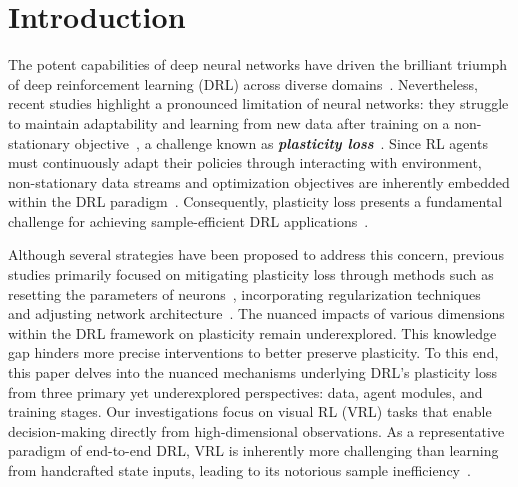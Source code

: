 \section{\textbf{Introduction}}
\vspace{-0.5\baselineskip}
The potent capabilities of deep neural networks have driven the brilliant triumph of deep reinforcement learning (DRL) across diverse domains~\citep{AlphaGo_Zero, AlphaFold, GPT4TR}.
Nevertheless, recent studies highlight a pronounced limitation of neural networks: they struggle to maintain adaptability and learning from new data after training on a non-stationary objective~\citep{capacity_loss, dormant_neuron}, a challenge known as \textbf{\textit{plasticity loss}}~\citep{understanding_plasticity, plasticity_loss_CRL}.
Since RL agents must continuously adapt their policies through interacting with environment, non-stationary data streams and optimization objectives are inherently embedded within the DRL paradigm~\citep{Regenerative_Regularization}.
Consequently, plasticity loss presents a fundamental challenge for achieving sample-efficient DRL applications~\citep{primacy_bias, breaking_RR_barrier}.

Although several strategies have been proposed to address this concern, previous studies primarily focused on mitigating plasticity loss through methods such as resetting the parameters of neurons~\citep{primacy_bias, breaking_RR_barrier, dormant_neuron}, incorporating regularization techniques~\citep{Regenerative_Regularization, understanding_plasticity, capacity_loss} and adjusting network architecture~\citep{BBF, continual_backprop, plasticity_loss_CRL}.
The nuanced impacts of various dimensions within the DRL framework on plasticity remain underexplored.
This knowledge gap hinders more precise interventions to better preserve plasticity.
To this end, this paper delves into the nuanced mechanisms underlying DRL's plasticity loss from three primary yet underexplored perspectives: data, agent modules, and training stages.
Our investigations focus on visual RL (VRL) tasks that enable decision-making directly from high-dimensional observations.
As a representative paradigm of end-to-end DRL, VRL is inherently more challenging than learning from handcrafted state inputs, leading to its notorious sample inefficiency~\citep{ma2022comprehensive, DrQ-v2, tomar2021learning}.

